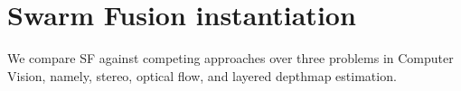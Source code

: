 \section{Swarm Fusion instantiation}

We compare SF against competing approaches over three problems in
Computer Vision, namely, stereo, optical flow, and layered depthmap
estimation.



